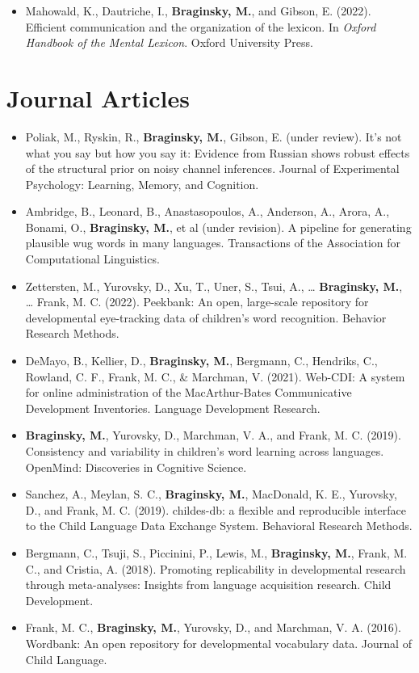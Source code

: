 \documentclass[11pt,]{article}
\providecommand{\tightlist}{%
  \setlength{\itemsep}{0pt}\setlength{\parskip}{0pt}}
\begin{document}
\begin{itemize}
\tightlist
\item
  Mahowald, K., Dautriche, I., \textbf{Braginsky, M.}, and Gibson, E.
  (2022). Efficient communication and the organization of the lexicon.
  In \emph{Oxford Handbook of the Mental Lexicon}. Oxford University
  Press.
\end{itemize}

\hypertarget{journal-articles}{%
\section{Journal Articles}\label{journal-articles}}

\begin{itemize}
\item
  Poliak, M., Ryskin, R., \textbf{Braginsky, M.}, Gibson, E. (under
  review). It's not what you say but how you say it: Evidence from
  Russian shows robust effects of the structural prior on noisy channel
  inferences. Journal of Experimental Psychology: Learning, Memory, and
  Cognition.
\item
  Ambridge, B., Leonard, B., Anastasopoulos, A., Anderson, A., Arora,
  A., Bonami, O., \textbf{Braginsky, M.}, et al (under revision). A
  pipeline for generating plausible wug words in many languages.
  Transactions of the Association for Computational Linguistics.
\item
  Zettersten, M., Yurovsky, D., Xu, T., Uner, S., Tsui, A., \ldots{}
  \textbf{Braginsky, M.}, \ldots{} Frank, M. C. (2022). Peekbank: An
  open, large-scale repository for developmental eye-tracking data of
  children's word recognition. Behavior Research Methods.
\item
  DeMayo, B., Kellier, D., \textbf{Braginsky, M.}, Bergmann, C.,
  Hendriks, C., Rowland, C. F., Frank, M. C., \& Marchman, V. (2021).
  Web-CDI: A system for online administration of the MacArthur-Bates
  Communicative Development Inventories. Language Development Research.
\item
  \textbf{Braginsky, M.}, Yurovsky, D., Marchman, V. A., and Frank, M.
  C. (2019). Consistency and variability in children's word learning
  across languages. OpenMind: Discoveries in Cognitive Science.
\item
  Sanchez, A., Meylan, S. C., \textbf{Braginsky, M.}, MacDonald, K. E.,
  Yurovsky, D., and Frank, M. C. (2019). childes-db: a flexible and
  reproducible interface to the Child Language Data Exchange System.
  Behavioral Research Methods.
\item
  Bergmann, C., Tsuji, S., Piccinini, P., Lewis, M., \textbf{Braginsky,
  M.}, Frank, M. C., and Cristia, A. (2018). Promoting replicability in
  developmental research through meta-analyses: Insights from language
  acquisition research. Child Development.
\item
  Frank, M. C., \textbf{Braginsky, M.}, Yurovsky, D., and Marchman, V.
  A. (2016). Wordbank: An open repository for developmental vocabulary
  data. Journal of Child Language.
\end{itemize}
\end{document}
